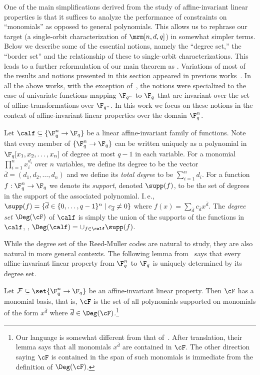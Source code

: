 One of the main simplifications derived from the study
of affine-invariant linear properties is that it suffices to
analyze the performance of constraints on ``monomials''
as opposed to general polynomials.
This allows us to rephrase our target (a single-orbit
characterization of $\mrm[n,d,q]$) in somewhat simpler
terms. Below we describe some of the essential notions,
namely the ``degree set,'' the ``border set'' and the
relationship of these to single-orbit characterizations.
This leads to a further reformulation of our main theorem
as .
Variations of most of the results and notions presented in this
section appeared in previous works~\cite{KS08,GKS09,BS11,BGMSS11}.
In all the above works, with the exception of~\cite{KS08},
the notions were specialized to the case of univariate functions
mapping $\F_{q^n}$ to $\F_q$
that are invariant over the set of affine-transformations over $\F_{q^n}$.
In this work we focus on these notions in the context of
affine-invariant linear properties over the domain $\F_q^n$.

Let $\calf \subseteq \{\F_{q}^n \to \F_q\}$ be a linear affine-invariant family of
functions. Note that every member of $\{\F_{q}^n \to \F_q\}$ can be written uniquely as
a polynomial in $\F_q[x_1,x_2,\ldots,x_n]$ of degree at most $q-1$ in each variable.
For a monomial  $\prod_{i=1}^nx_i^{d_i}$ over $n$ variables,  we define its degree to be the vector $\overline d = (d_1,d_2, \ldots, d_n)$ and we define its \emph{total degree} to be $\sum_{i=1}^n d_i$.
For a function
$f:\F_{q}^n \to \F_q$ we denote its \emph{support}, denoted $\supp(f)$, to
be the set of degrees in the support of the associated polynomial. I.\,e.,
$\supp(f) = \{ \overline d \in \{0,\ldots,q-1\}^n\;|\;c_{\overline d} \ne 0\}$ where $f(x) = \sum_{\overline d} c_{\overline d} x^{\overline d}$.
The \emph{degree set} $\Deg(\cF)$ of $\calf$ is simply the union of the supports of the functions
in $\calf$, \ie, $\Deg(\calf) = \cup_{f \in \calf} \supp(f)$.

While the degree set of the Reed-Muller codes are natural to study, they
are also natural in more general contexts.
The following lemma from~\cite{KS08} says that every affine-invariant linear property from $\F_q^n$ to $\F_q$ is uniquely determined by its degree set.

\begin{lemma}\label{lem:monomial-extraction}
Let $\mathcal{F} \subseteq \set{\F_{q}^n \to \F_q}$ be an affine-invariant linear property. Then $\cF$ has a monomial basis, that is, $\cF$ is the set of
all polynomials supported on monomials of the form $x^{\overline d}$ where $\overline d  \in \Deg(\cF)$.\footnote{Our language is somewhat different from that of~\cite{KS08-ECCC}. After
translation, their lemma says that all monomials $x^{\overline d}$
are contained in $\cF$. The other direction saying $\cF$ is contained
in the span of such monomials is immediate from the definition of
$\Deg(\cF)$.}
\end{lemma}

